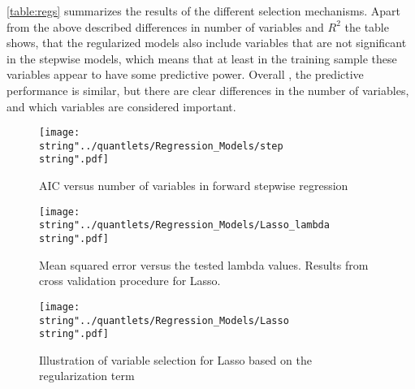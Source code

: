 \autoref{table:regs} summarizes the results of the different selection mechanisms. Apart from the above described differences in number of variables and  $R^{2}$ the table shows, that the regularized models also include variables that are not significant in the stepwise models, which means that at least in the training sample these variables appear to have some predictive power. Overall , the predictive performance is similar, but there are clear differences in the number of variables, and which variables are considered important. 
\begin{figure}[H]
  \centering
\texttt{[image: \\string"../quantlets/Regression\_Models/step\\string".pdf]}
  \caption{AIC versus number of variables in forward stepwise regression}\label{fig:step}
\end{figure}
 
\begin{figure}[H]
  \centering
\texttt{[image: \\string"../quantlets/Regression\_Models/Lasso\_lambda\\string".pdf]}
  \caption{Mean squared error versus the tested lambda values. Results from cross validation procedure for Lasso.}\label{fig:Lasso}
\end{figure}

\begin{figure}[H]
  \centering
\texttt{[image: \\string"../quantlets/Regression\_Models/Lasso\\string".pdf]}
  \caption{Illustration of variable selection for Lasso based on the regularization term}\label{fig:Lasso1}
\end{figure}

 
\FloatBarrier